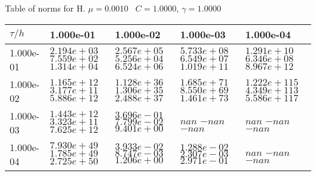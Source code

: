 \begin{center}
Table of norms for H. $\mu = 0.0010$ \, $C = 1.0000$, $\gamma = 1.0000$
  
\begin{tabular}{|p{1in}|p{1in}|p{1in}|p{1in}|p{1in}|} \hline
$\tau / h$ &1.000e-01 &1.000e-02 &1.000e-03 &1.000e-04 \\ \hline 
1.000e-01 & $2.194e+03$  $7.559e+02$  $1.314e+04$  & $2.567e+05$  $5.256e+04$  $6.524e+06$  & $5.733e+08$  $6.549e+07$  $1.019e+11$  & $1.291e+10$  $6.346e+08$  $8.967e+12$  \\ \hline 
1.000e-02 & $1.165e+12$  $3.177e+11$  $5.886e+12$  & $1.128e+36$  $1.306e+35$  $2.488e+37$  & $1.685e+71$  $8.550e+69$  $1.461e+73$  & $1.222e+115$  $4.349e+113$  $5.586e+117$  \\ \hline 
1.000e-03 & $1.443e+12$  $3.323e+11$  $7.625e+12$  & $3.696e-01$  $7.799e-02$  $9.401e+00$  & $nan$  $-nan$  $-nan$  & $nan$  $-nan$  $-nan$  \\ \hline 
1.000e-04 & $7.930e+49$  $1.785e+49$  $2.725e+50$  & $3.933e-02$  $8.747e-03$  $1.206e+00$  & $1.288e-02$  $2.307e-03$  $2.971e-01$  & $nan$  $-nan$  $-nan$  \\ \hline 

\end{tabular}\\[20pt]
\end{center}
